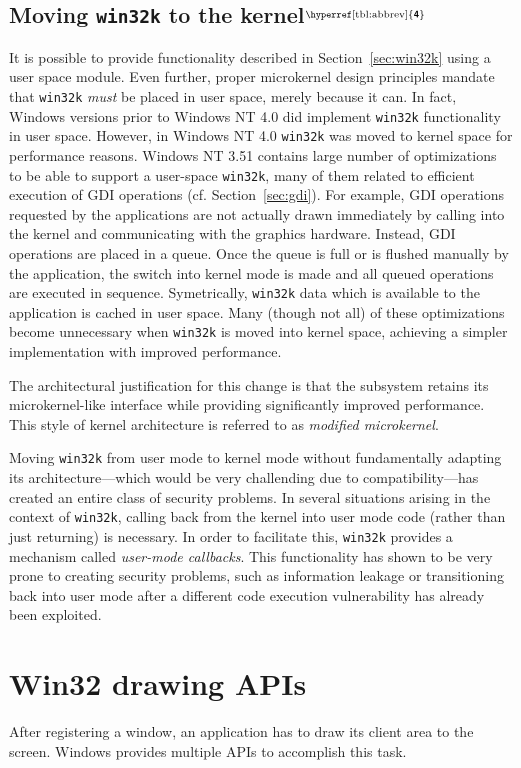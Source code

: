 \documentclass[10pt,twocolumn,a4paper,os=win]{article}
\newcommand{\bs}[1]{\textbf{\sffamily #1}}
\newcommand{\winver}[1]{$^{\text{\hyperref[tbl:abbrev]{\bs{#1}}}}$}
\newcommand{\winsubsection}[2]{\subsection[#1]{#1\winver{#2}}}
\begin{document}
		\winsubsection{Moving \texttt{win32k} to the kernel}{4}
			It is possible to provide functionality described in Section~\ref{sec:win32k}
			using a user space module. Even further, proper microkernel design principles
			mandate that \texttt{win32k} \emph{must} be placed in user space, merely
			because it can. In fact, Windows versions prior to Windows NT 4.0
			did implement \texttt{win32k} functionality in user space. However,
			in Windows NT 4.0 \texttt{win32k} was moved to kernel space for
			performance reasons. Windows NT 3.51 contains large number of optimizations
			to be able to support a user-space \texttt{win32k}, many of them related
			to efficient execution of GDI operations (cf. Section~\ref{sec:gdi}).
			For example, GDI operations requested by the applications are not
			actually drawn immediately by calling into the kernel and communicating
			with the graphics hardware. Instead, GDI operations are placed in a
			queue. Once the queue is full or is flushed manually by the application,
			the switch into kernel mode is made and all queued operations are executed
			in sequence. Symetrically, \texttt{win32k} data which is available to the application
			is cached in user space.
			Many (though not all) of these optimizations become unnecessary when
			\texttt{win32k} is moved into kernel space, achieving a simpler implementation
			with improved performance.
			\cite{gdikernel}

			The architectural justification for this change is that the subsystem
			retains its microkernel-like interface while providing significantly
			improved performance. This style of kernel architecture is referred
			to as \emph{modified microkernel}. \cite{gdikernel}

			Moving \texttt{win32k} from user mode to kernel mode without fundamentally
			adapting its architecture---which would be very challending due to
			compatibility---has created an entire class of security problems.
			In several situations arising in the context of \texttt{win32k},
			calling back from the kernel into user mode code (rather than just
			returning) is necessary. In order to facilitate this, \texttt{win32k}
			provides a mechanism called \textit{user-mode callbacks}. This
			functionality has shown to be very prone to creating security problems,
			such as information leakage or transitioning back into user mode after
			a different code execution vulnerability has already been exploited.
			\cite{mandy2011kernel}

	\section{Win32 drawing APIs}
		After registering a window, an application has to draw its client area
		to the screen. Windows provides multiple APIs to accomplish this task.
\end{document}
